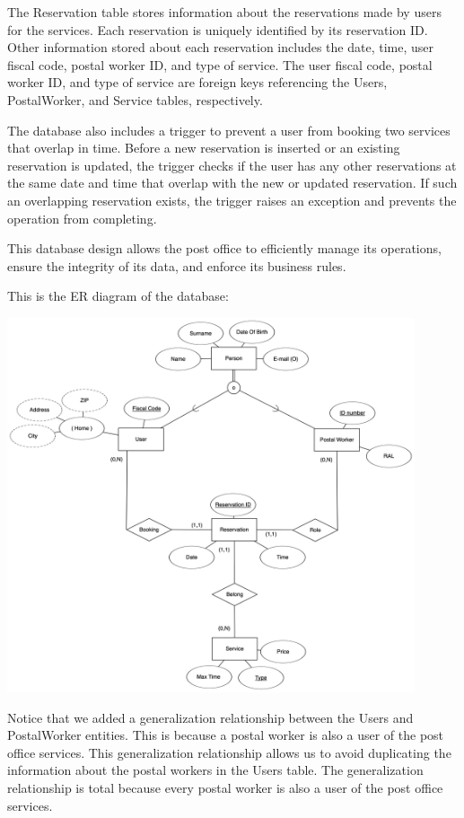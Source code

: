 \documentclass{article}
\begin{document}
The Reservation table stores information about the reservations made by users for the services. Each reservation is uniquely identified by its reservation ID\@. Other information stored about each reservation includes the date, time, user fiscal code, postal worker ID, and type of service. The user fiscal code, postal worker ID, and type of service are foreign keys referencing the Users, PostalWorker, and Service tables, respectively.

The database also includes a trigger to prevent a user from booking two services that overlap in time. Before a new reservation is inserted or an existing reservation is updated, the trigger checks if the user has any other reservations at the same date and time that overlap with the new or updated reservation. If such an overlapping reservation exists, the trigger raises an exception and prevents the operation from completing.

This database design allows the post office to efficiently manage its operations, ensure the integrity of its data, and enforce its business rules.

This is the ER diagram of the database:
\begin{center}
\includegraphics[width=12cm]{images/PostOfficeERdiagram.png}
\end{center}

Notice that we added a generalization relationship between the Users and PostalWorker entities. This is because a postal worker is also a user of the post office services. This generalization relationship allows us to avoid duplicating the information about the postal workers in the Users table. The generalization relationship is total because every postal worker is also a user of the post office services.
\end{document}
